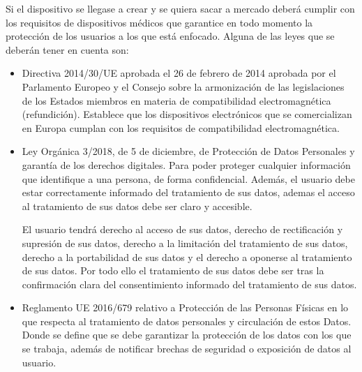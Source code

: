 Si el dispositivo se llegase a crear y se quiera sacar a mercado deberá cumplir con los requisitos de dispositivos médicos que garantice en todo momento la protección de los usuarios a los que está enfocado. Alguna de las leyes que se deberán tener en cuenta son:
\begin{itemize}
    \item Directiva 2014/30/UE aprobada el 26 de febrero de 2014 aprobada por el Parlamento Europeo y el Consejo sobre la armonización de las legislaciones de los Estados miembros en materia de compatibilidad electromagnética (refundición). Establece que los dispositivos electrónicos que se comercializan en Europa cumplan con los requisitos de compatibilidad electromagnética.
    \item Ley Orgánica 3/2018, de 5 de diciembre, de Protección de Datos Personales y garantía de los derechos digitales. Para poder proteger cualquier información que identifique a una persona, de forma confidencial. Además, el usuario debe estar correctamente informado del tratamiento de sus datos, ademas el acceso al tratamiento de sus datos debe ser claro y accesible.

    El usuario tendrá derecho al acceso de sus datos, derecho de rectificación y supresión de sus datos, derecho a la limitación del tratamiento de sus datos, derecho a la portabilidad de sus datos y el derecho a oponerse al tratamiento de sus datos. Por todo ello el tratamiento de sus datos debe ser tras la confirmación clara del consentimiento informado del tratamiento de sus datos.
    
    \item Reglamento UE 2016/679 relativo a Protección de las Personas Físicas en lo que respecta al tratamiento de datos personales y circulación de estos Datos. Donde se define que se debe garantizar la protección de los datos con los que se trabaja, además de notificar brechas de seguridad o exposición de datos al usuario.


\end{itemize}
